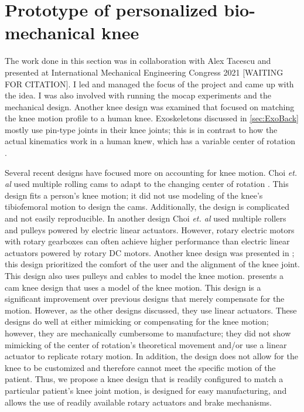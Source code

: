 \section{Prototype of personalized bio-mechanical knee}

The work done in this section was in collaboration with Alex Tacescu \cite{tacescu2021development} and presented at International Mechanical Engineering Congress 2021 [WAITING FOR CITATION]. I led and managed the focus of the project and came up with the idea. I was also involved with running the mocap experiments and the mechanical design. Another knee design was examined that focused on matching the knee motion profile to a human knee. Exoskeletons discussed in \autoref{sec:ExoBack} mostly use pin-type joints in their knee joints; this is in contrast to how the actual kinematics work in a human knew, which has a variable center of rotation \cite{morrison1970mechanics} \cite{koo2008knee}.

Several recent designs have focused more on accounting for knee motion. Choi \textit{et. al} used multiple rolling cams to adapt to the changing center of rotation \cite{choi2017development}. This design fits a person's knee motion; it did not use modeling of the knee's tibiofemoral motion to design the cams. Additionally, the design is complicated and not easily reproducible. In another design Choi \textit{et. al} used multiple rollers and pulleys powered by electric linear actuators. However, rotary electric motors with rotary gearboxes can often achieve higher performance than electric linear actuators powered by rotary DC motors. Another knee design was presented in \cite{wang2018comfort}; this design prioritized the comfort of the user and the alignment of the knee joint. This design also uses pulleys and cables to model the knee motion. \cite{AdaptiveKneeJoint} presents a cam knee design that uses a model of the knee motion. This design is a significant improvement over previous designs that merely compensate for the motion. However, as the other designs discussed, they use linear actuators.  These designs do well at either mimicking or compensating for the knee motion; however, they are mechanically cumbersome to manufacture; they did not show mimicking of the center of rotation's theoretical movement and/or use a linear actuator to replicate rotary motion. In addition, the design does not allow for the knee to be customized and therefore cannot meet the specific motion of the patient. Thus, we propose a knee design that is readily configured to match a particular patient's knee joint motion, is designed for easy manufacturing, and allows the use of readily available rotary actuators and brake mechanisms.

